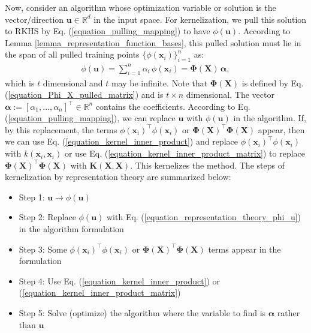 \documentclass[lang=cn,10pt]{gorgeousnbook}
\numberwithin{equation}{section}%
\numberwithin{figure}{section}%
\begin{document}
Now, consider an algorithm whose optimization variable or solution is the vector/direction $\boldsymbol{u} \in \mathbb{R}^d$ in the input space. 
For kernelization, we pull this solution to RKHS by Eq. (\ref{equation_pulling_mapping}) to have $\phi(\boldsymbol{u})$. 
According to Lemma \ref{lemma_representation_function_bases}, this pulled solution must lie in the span of all pulled training points $\{\phi(\boldsymbol{x}_i)\}_{i=1}^n$ as:
\begin{align}\label{equation_representation_theory_phi_u}
\phi(\boldsymbol{u}) = \sum_{i=1}^n \alpha_i\, \phi(\boldsymbol{x}_i) = \boldsymbol{\Phi}(\boldsymbol{X})\, \boldsymbol{\alpha},
\end{align}
which is $t$ dimensional and $t$ may be infinite. Note that $\boldsymbol{\Phi}(\boldsymbol{X})$ is defined by Eq. (\ref{equation_Phi_X_pulled_matrix}) and is $t \times n$ dimensional. The vector $\boldsymbol{\alpha} := [\alpha_1, \dots, \alpha_n]^\top \in \mathbb{R}^n$ contains the coefficients. 
According to Eq. (\ref{equation_pulling_mapping}), we can replace $\boldsymbol{u}$ with $\phi(\boldsymbol{u})$ in the algorithm. If, by this replacement, the terms $\phi(\boldsymbol{x}_i)^\top \phi(\boldsymbol{x}_i)$ or $\boldsymbol{\Phi}(\boldsymbol{X})^\top \boldsymbol{\Phi}(\boldsymbol{X})$ appear, then we can use Eq. (\ref{equation_kernel_inner_product}) and replace $\phi(\boldsymbol{x}_i)^\top \phi(\boldsymbol{x}_i)$ with $k(\boldsymbol{x}_i, \boldsymbol{x}_i)$ or use Eq. (\ref{equation_kernel_inner_product_matrix}) to replace $\boldsymbol{\Phi}(\boldsymbol{X})^\top \boldsymbol{\Phi}(\boldsymbol{X})$ with $\boldsymbol{K}(\boldsymbol{X}, \boldsymbol{X})$. 
This kernelizes the method. The steps of kernelization by representation theory are summarized below:
\begin{itemize}[topsep=0pt,itemsep=-1ex,partopsep=1ex,parsep=1ex]
\item Step 1: $\boldsymbol{u} \rightarrow \phi(\boldsymbol{u})$
\item Step 2: Replace $\phi(\boldsymbol{u})$ with Eq. (\ref{equation_representation_theory_phi_u}) in the algorithm formulation
\item Step 3: Some $\phi(\boldsymbol{x}_i)^\top \phi(\boldsymbol{x}_i)$ or $\boldsymbol{\Phi}(\boldsymbol{X})^\top \boldsymbol{\Phi}(\boldsymbol{X})$ terms appear in the formulation
\item Step 4: Use Eq. (\ref{equation_kernel_inner_product}) or (\ref{equation_kernel_inner_product_matrix})
\item Step 5: Solve (optimize) the algorithm where the variable to find is $\boldsymbol{\alpha}$ rather than $\boldsymbol{u}$
\end{itemize}
\end{document}
